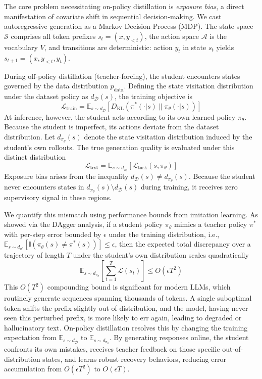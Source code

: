 \documentclass{article} %
\newcommand{\KL}{D_{\mathrm{KL}}}
\newcommand{\pdata}{p_{\mathrm{data}}}
\newcommand{\loss}{\mathcal{L}}
\begin{document}
The core problem necessitating on-policy distillation is \textit{exposure bias}, a direct manifestation of covariate shift in sequential decision-making. We cast autoregressive generation as a Markov Decision Process (MDP). The state space $\mathcal{S}$ comprises all token prefixes $s_t = (x, y_{<t})$, the action space $\mathcal{A}$ is the vocabulary $V$, and transitions are deterministic: action $y_t$ in state $s_t$ yields $s_{t+1} = (x, y_{<t}, y_t)$.

During off-policy distillation (teacher-forcing), the student encounters states governed by the data distribution $\pdata$. Defining the state visitation distribution under the dataset policy as $d_{\mathcal{D}}(s)$, the training objective is
\begin{equation}
    \loss_{\mathrm{train}} = \mathbb{E}_{s \sim d_{\mathcal{D}}} \left[ \KL(\pi^*(\cdot|s) \parallel \pi_\theta(\cdot|s)) \right]
\end{equation}
At inference, however, the student acts according to its own learned policy $\pi_\theta$. Because the student is imperfect, its actions deviate from the dataset distribution. Let $d_{\pi_\theta}(s)$ denote the state visitation distribution induced by the student's own rollouts. The true generation quality is evaluated under this distinct distribution
\begin{equation}
    \loss_{\mathrm{test}} = \mathbb{E}_{s \sim d_{\pi_\theta}} \left[ \loss_{\mathrm{task}}(s, \pi_\theta) \right]
\end{equation}
Exposure bias arises from the inequality $d_{\mathcal{D}}(s) \neq d_{\pi_\theta}(s)$. Because the student never encounters states in $d_{\pi_\theta}(s) \setminus d_{\mathcal{D}}(s)$ during training, it receives zero supervisory signal in these regions.

We quantify this mismatch using performance bounds from imitation learning. As \citet{ross2011reduction} showed via the DAgger analysis, if a student policy $\pi_\theta$ mimics a teacher policy $\pi^*$ with per-step error bounded by $\epsilon$ under the training distribution, i.e., $\mathbb{E}_{s \sim d_{\pi^*}}[\mathbb{I}(\pi_\theta(s) \neq \pi^*(s))] \le \epsilon$, then the expected total discrepancy over a trajectory of length $T$ under the student's own distribution scales quadratically
\begin{equation}
    \mathbb{E}_{s \sim d_{\pi_\theta}} \left[ \sum_{t=1}^T \mathcal{L}(s_t) \right] \le O(\epsilon T^2)
\end{equation}
This $O(T^2)$ compounding bound is significant for modern LLMs, which routinely generate sequences spanning thousands of tokens. A single suboptimal token shifts the prefix slightly out-of-distribution, and the model, having never seen this perturbed prefix, is more likely to err again, leading to degraded or hallucinatory text. On-policy distillation resolves this by changing the training expectation from $\mathbb{E}_{s \sim d_{\mathcal{D}}}$ to $\mathbb{E}_{s \sim d_{\pi_\theta}}$. By generating responses online, the student confronts its own mistakes, receives teacher feedback on those specific out-of-distribution states, and learns robust recovery behaviors, reducing error accumulation from $O(\epsilon T^2)$ to $O(\epsilon T)$.
\end{document}
